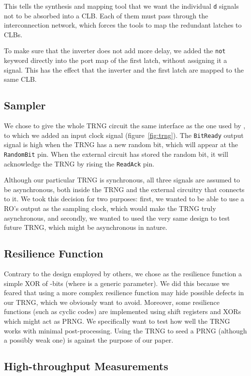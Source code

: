\documentclass[conference]{IEEEtran}
\begin{document}
This tells the synthesis and mapping tool that we want the individual {\tt d} signals not to be absorbed into a CLB. Each of them must pass through the interconnection network, which forces the tools to map the redundant latches to CLBs.

To make sure that the inverter does not add more delay, we added the {\tt not} keyword directly into the port map of the first latch, without assigning it a signal. This has the effect that the inverter and the first latch are mapped to the same CLB.

\subsection{Sampler}
We chose to give the whole TRNG circuit the same interface as the one used by \cite{Ko04}, to which we added an input clock signal (figure~\ref{fig:trng}). The {\tt BitReady} output signal is high when the TRNG has a new random bit, which will appear at the {\tt RandomBit} pin. When the external circuit has stored the random bit, it will acknowledge the TRNG by rising the {\tt ReadAck} pin.

Although our particular TRNG is synchronous, all three signals are assumed to be asynchronous, both inside the TRNG and the external circuitry that connects to it. We took this decision for two purposes: first, we wanted to be able to use a RO's output as the sampling clock, which would make the TRNG truly asynchronous, and secondly, we wanted to used the very same design to test future TRNG, which might be asynchronous in nature.

\subsection{Resilience Function}
Contrary to the design employed by others, we chose as the resilience function a simple XOR of -bits (where  is a generic parameter). We did this because we feared that using a more complex resilience function may hide possible defects in our TRNG, which we obviously want to avoid. Moreover, some resilience functions (such as cyclic codes) are implemented using shift registers and XORs which might act as PRNG. We specifically want to test how well the TRNG works with minimal post-processing. Using the TRNG to seed a PRNG (although a possibly weak one) is against the purpose of our paper.

\subsection{High-throughput Measurements}
\end{document}
